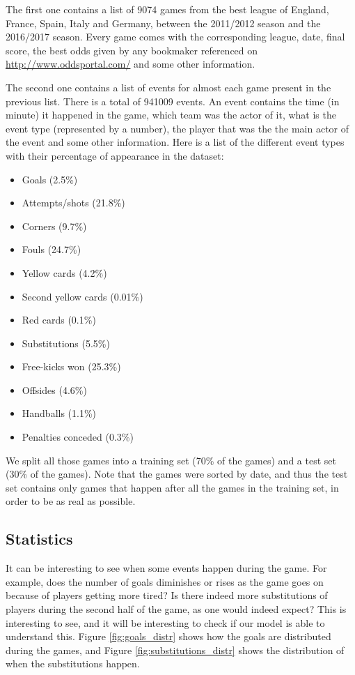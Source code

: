 \documentclass[10pt,conference,onecolumn]{IEEEtran}
\begin{document}
The first one contains a list of 9074 games from the best league of England, France, Spain, Italy and Germany, between the 2011/2012 season and the 2016/2017 season. Every game comes with the corresponding league, date, final score, the best odds given by any bookmaker referenced on \url{http://www.oddsportal.com/} and some other information.

The second one contains a list of events for almost each game present in the previous list. There is a total of 941009 events. An event contains the time (in minute) it happened in the game, which team was the actor of it, what is the event type (represented by a number), the player that was the the main actor of the event and some other information. Here is a list of the different event types with their percentage of appearance in the dataset:
\begin{itemize}
  \item Goals (2.5\%)
  \item Attempts/shots (21.8\%)
  \item Corners (9.7\%)
  \item Fouls (24.7\%)
  \item Yellow cards (4.2\%)
  \item Second yellow cards (0.01\%)
  \item Red cards (0.1\%)
  \item Substitutions (5.5\%)
  \item Free-kicks won (25.3\%)
  \item Offsides (4.6\%)
  \item Handballs (1.1\%)
  \item Penalties conceded (0.3\%)
\end{itemize}

We split all those games into a training set (70\% of the games) and a test set (30\% of the games). Note that the games were sorted by date, and thus the test set contains only games that happen after all the games in the training set, in order to be as real as possible.

\subsection{Statistics}\label{ssec:statistics}
It can be interesting to see when some events happen during the game. For example, does the number of goals diminishes or rises as the game goes on because of players getting more tired? Is there indeed more substitutions of players during the second half of the game, as one would indeed expect? This is interesting to see, and it will be interesting to check if our model is able to understand this. Figure \ref{fig:goals_distr} shows how the goals are distributed during the games, and Figure \ref{fig:substitutions_distr} shows the distribution of when the substitutions happen.
\end{document}
